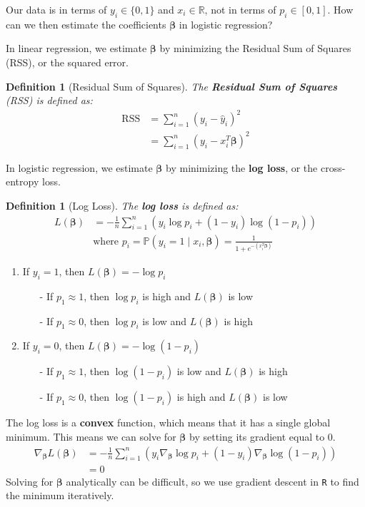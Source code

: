 \documentclass[twoside]{article}
\newtheorem{definition}[theorem]{Definition}
\theoremstyle{definition}
\begin{document}
Our data is in terms of $y_i \in \{0, 1\}$ and $x_i \in \mathbb{R}$, not in terms of $p_i \in [0, 1]$. How can we then estimate the coefficients $\boldsymbol{\beta}$ in logistic regression?

In linear regression, we estimate $\boldsymbol{\beta}$ by minimizing the Residual Sum of Squares (RSS), or the squared error.
\begin{definition}[Residual Sum of Squares]
    The \textbf{Residual Sum of Squares} (RSS) is defined as:
    \begin{align}
        \text{RSS} &= \sum_{i=1}^n (y_i - \widehat{y}_i)^2 \nonumber \\
        &= \sum_{i=1}^n (y_i - x_i^T\boldsymbol{\beta})^2
    \end{align}
\end{definition}
In logistic regression, we estimate $\boldsymbol{\beta}$ by minimizing the \textbf{log loss}, or the cross-entropy loss.
\begin{definition}[Log Loss]
    The \textbf{log loss} is defined as:
    \begin{align}
        L(\boldsymbol{\beta}) &= -\frac{1}{n}\sum_{i=1}^n \left(y_i \log p_i + (1 - y_i) \log (1 - p_i)\right) \nonumber \\
        &\text{where } p_i = \mathbb{P}(y_i = 1 \mid x_i, \boldsymbol{\beta}) = \frac{1}{1 + e^{-(x_i^T\boldsymbol{\beta})}}
    \end{align}
\end{definition}
\begin{enumerate}
    \item If $y_i = 1$, then $L(\boldsymbol{\beta}) = -\log p_i$
    \begin{itemize}
        \item[-] If $p_1 \approx 1$, then $\log p_i$ is high and $L(\boldsymbol{\beta})$ is low
        \item[-] If $p_1 \approx 0$, then $\log p_i$ is low and $L(\boldsymbol{\beta})$ is high
    \end{itemize}
    \item If $y_i = 0$, then $L(\boldsymbol{\beta}) = -\log (1 - p_i)$
    \begin{itemize}
        \item[-] If $p_1 \approx 1$, then $\log (1 - p_i)$ is low and $L(\boldsymbol{\beta})$ is high
        \item[-] If $p_1 \approx 0$, then $\log (1 - p_i)$ is high and $L(\boldsymbol{\beta})$ is low
    \end{itemize}
\end{enumerate}
The log loss is a \textbf{convex} function, which means that it has a single global minimum. This means we can solve for $\boldsymbol{\beta}$ by setting its gradient equal to 0.
\begin{align}
    \nabla_{\boldsymbol{\beta}} L(\boldsymbol{\beta}) &= -\frac{1}{n}\sum_{i=1}^n \left(y_i \nabla_{\boldsymbol{\beta}} \log p_i + (1 - y_i) \nabla_{\boldsymbol{\beta}} \log (1 - p_i)\right) \nonumber \\
    &= 0
\end{align}
Solving for $\boldsymbol{\beta}$ analytically can be difficult, so we use gradient descent in \texttt{R} to find the minimum iteratively.
\end{document}
